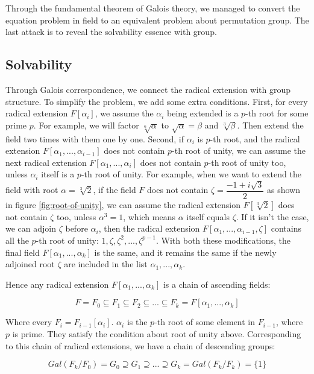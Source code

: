 \documentclass{article}
\begin{document}
Through the fundamental theorem of Galois theory, we managed to convert the equation problem in field to an equivalent problem about permutation group. The last attack is to reveal the solvability essence with group.

\subsection{Solvability}

Through Galois correspondence, we connect the radical extension with group structure. To simplify the problem, we add some extra conditions. First, for every radical extension $F[\alpha_i]$, we assume the $\alpha_i$ being extended is a $p$-th root for some prime $p$. For example, we will factor $\sqrt[6]{\alpha}$ to $\sqrt{\alpha} = \beta$ and $\sqrt[3]{\beta}$. Then extend the field two times with them one by one. Second, if $\alpha_i$ is $p$-th root, and the radical extension $F[\alpha_1, ..., \alpha_{i-1}]$ does not contain $p$-th root of unity, we can assume the next radical extension $F[\alpha_1, ..., \alpha_i]$ does not contain $p$-th root of unity too, unless $\alpha_i$ itself is a $p$-th root of unity. For example, when we want to extend the field with root $\alpha = \sqrt[3]{2}$, if the field $F$ does not contain $\zeta = \dfrac{-1 + i\sqrt{3}}{2}$ as shown in figure \ref{fig:root-of-unity}, we can assume the radical extension $F[\sqrt[3]{2}]$ does not contain $\zeta$ too, unless $\alpha^3 = 1$, which means $\alpha$ itself equals $\zeta$. If it isn't the case, we can adjoin $\zeta$ before $\alpha_i$, then the radical extension $F[\alpha_1, ..., \alpha_{i-1}, \zeta]$ contains all the $p$-th root of unity: $1, \zeta, \zeta^2, ..., \zeta^{p-1}$. With both these modifications, the final field $F[\alpha_1, ..., \alpha_k]$ is the same, and it remains the same if the newly adjoined root $\zeta$ are included in the list $\alpha_1, ..., \alpha_k$.

Hence any radical extension $F[\alpha_1, ..., \alpha_k]$ is a chain of ascending fields:

\[
F = F_0 \subseteq F_1 \subseteq F_2 \subseteq ... \subseteq F_k = F[\alpha_1, ..., \alpha_k]
\]

Where every $F_i = F_{i-1}[\alpha_i]$. $\alpha_i$ is the $p$-th root of some element in $F_{i-1}$, where $p$ is prime. They satisfy the condition about root of unity above. Corresponding to this chain of radical extensions, we have a chain of descending groups:

\[
Gal(F_k/F_0) = G_0 \supseteq G_1 \supseteq ... \supseteq G_k = Gal(F_k/F_k) = \{1\}
\]
\end{document}
